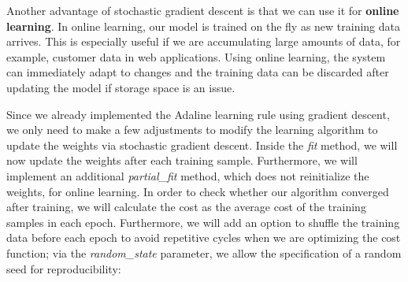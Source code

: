 \documentclass[11pt]{article}
\begin{document}
    Another advantage of stochastic gradient descent is that we can use it
for \textbf{online learning}. In online learning, our model is trained
on the fly as new training data arrives. This is especially useful if we
are accumulating large amounts of data, for example, customer data in
web applications. Using online learning, the system can immediately
adapt to changes and the training data can be discarded after updating
the model if storage space is an issue.

    Since we already implemented the Adaline learning rule using gradient
descent, we only need to make a few adjustments to modify the learning
algorithm to update the weights via stochastic gradient descent. Inside
the \emph{fit} method, we will now update the weights after each
training sample. Furthermore, we will implement an additional
\emph{partial\_fit} method, which does not reinitialize the weights, for
online learning. In order to check whether our algorithm converged after
training, we will calculate the cost as the average cost of the training
samples in each epoch. Furthermore, we will add an option to shuffle the
training data before each epoch to avoid repetitive cycles when we are
optimizing the cost function; via the \emph{random\_state} parameter, we
allow the specification of a random seed for reproducibility:
\end{document}
